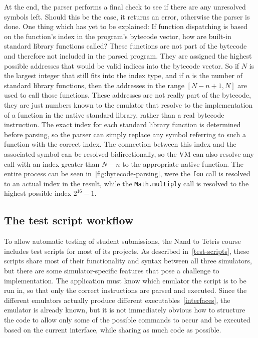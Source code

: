 At the end, the parser performs a final check to see if there are any unresolved symbols left.
Should this be the case, it returns an error, otherwise the parser is done.
One thing which has yet to be explained: If function dispatching is based on the function's index in the program's bytecode vector, how are built-in standard library functions called?
These functions are not part of the bytecode and therefore not included in the parsed program.
They are assigned the highest possible addresses that would be valid indices into the bytecode vector.
So if \(N\) is the largest integer that still fits into the index type, and if \(n\) is the number of standard library functions, then the addresses in the range \([N - n + 1, N]\) are used to call those functions.
These addresses are not really part of the bytecode, they are just numbers known to the emulator that resolve to the implementation of a function in the native standard library, rather than a real bytecode instruction.
The exact index for each standard library function is determined before parsing, so the parser can simply replace any symbol referring to such a function with the correct index.
The connection between this index and the associated symbol can be resolved bidirectionally, so the VM can also resolve any call with an index greater than \(N - n\) to the appropriate native function.
The entire process can be seen in~\cref{fig:bytecode-parsing}, were the \verb+foo+ call is resolved to an actual index in the result, while the \verb+Math.multiply+ call is resolved to the highest possible index \(2^{16}-1\).

\subsection{The test script workflow} \label{test-script-workflow}
To allow automatic testing of student submissions, the Nand to Tetris course includes test scripts for most of its projects.
As described in~\cref{test-scripts}, these scripts share most of their functionality and syntax between all three simulators, but there are some simulator-specific features that pose a challenge to implementation.
The application must know which emulator the script is to be run in, so that only the correct instructions are parsed and executed.
Since the different emulators actually produce different executables~\ref{interfaces}, the emulator is already known, but it is not immediately obvious how to structure the code to allow only some of the possible commands to occur and be executed based on the current interface, while sharing as much code as possible.

